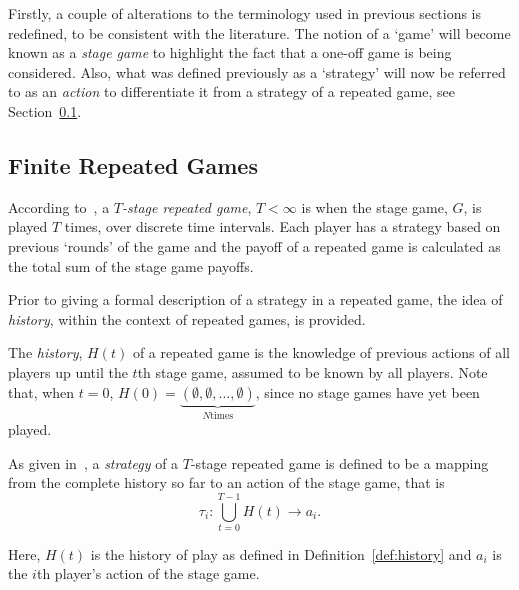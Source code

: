 Firstly, a couple of alterations to the terminology used in
previous sections is redefined, to be consistent with the
literature. The notion of a `game' will become known as a
\textit{stage game} to highlight the fact that a one-off game is being
considered. Also, what was defined previously as a `strategy' will now be
referred to as an \textit{action} to differentiate it from a strategy of a
repeated game, see Section~\ref{subsec:Finite_Repeated_Games}.

\subsection{Finite Repeated Games}\label{subsec:Finite_Repeated_Games}
According to~\cite{Knight2017a}, a \textit{\(T\)-stage repeated game}, \(T <
\infty \) is when the stage game, \(G\), is played \(T\) times, over discrete
time intervals. Each player has a strategy based on previous `rounds' of
the game and the payoff of a repeated game is calculated as the total sum of the
stage game payoffs.

Prior to giving a formal description of a strategy in a repeated game, the idea
of \textit{history}, within the context of repeated games, is provided.

\begin{definition}
    The \textit{history}, \(H(t)\) of a repeated game is the knowledge of
    previous actions of all players up until the \(t\)th stage game, assumed to
    be known by all players. Note that, when \(t=0\), \(H(0) =
\underbrace{(\emptyset, \emptyset, \ldots, \emptyset)}_{N \text{times}}\), since
no stage games have yet been played.
\end{definition}\label{def:history}

\begin{definition}
    As given in~\cite{Knight2019a,maschler_solan_zamir_2013}, a
    \textit{strategy} of a \(T\)-stage repeated
    game is defined to be a mapping from the complete history so far to an
    action of the stage game, that is 
    \begin{equation}
        \tau_{i} : \bigcup_{t = 0}^{T-1}{H(t)} \to a_{i}.
    \end{equation}    
\end{definition}

Here, \(H(t)\) is the history of play as defined in Definition~\ref{def:history} and
\(a_{i}\) is the \(i\)th player's action of the stage game. 

